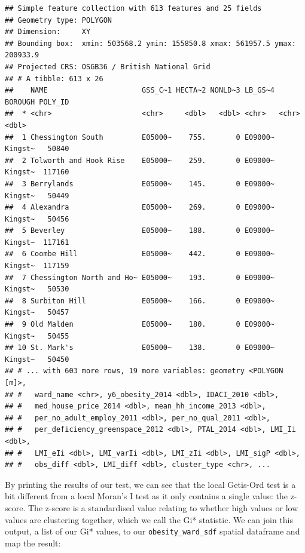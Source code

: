 \documentclass[
]{book}
\begin{document}
\begin{verbatim}
## Simple feature collection with 613 features and 25 fields
## Geometry type: POLYGON
## Dimension:     XY
## Bounding box:  xmin: 503568.2 ymin: 155850.8 xmax: 561957.5 ymax: 200933.9
## Projected CRS: OSGB36 / British National Grid
## # A tibble: 613 x 26
##    NAME                      GSS_C~1 HECTA~2 NONLD~3 LB_GS~4 BOROUGH POLY_ID
##  * <chr>                     <chr>     <dbl>   <dbl> <chr>   <chr>     <dbl>
##  1 Chessington South         E05000~    755.       0 E09000~ Kingst~   50840
##  2 Tolworth and Hook Rise    E05000~    259.       0 E09000~ Kingst~  117160
##  3 Berrylands                E05000~    145.       0 E09000~ Kingst~   50449
##  4 Alexandra                 E05000~    269.       0 E09000~ Kingst~   50456
##  5 Beverley                  E05000~    188.       0 E09000~ Kingst~  117161
##  6 Coombe Hill               E05000~    442.       0 E09000~ Kingst~  117159
##  7 Chessington North and Ho~ E05000~    193.       0 E09000~ Kingst~   50530
##  8 Surbiton Hill             E05000~    166.       0 E09000~ Kingst~   50457
##  9 Old Malden                E05000~    180.       0 E09000~ Kingst~   50455
## 10 St. Mark's                E05000~    138.       0 E09000~ Kingst~   50450
## # ... with 603 more rows, 19 more variables: geometry <POLYGON [m]>,
## #   ward_name <chr>, y6_obesity_2014 <dbl>, IDACI_2010 <dbl>,
## #   med_house_price_2014 <dbl>, mean_hh_income_2013 <dbl>,
## #   per_no_adult_employ_2011 <dbl>, per_no_qual_2011 <dbl>,
## #   per_deficiency_greenspace_2012 <dbl>, PTAL_2014 <dbl>, LMI_Ii <dbl>,
## #   LMI_eIi <dbl>, LMI_varIi <dbl>, LMI_zIi <dbl>, LMI_sigP <dbl>,
## #   obs_diff <dbl>, LMI_diff <dbl>, cluster_type <chr>, ...
\end{verbatim}

By printing the results of our test, we can see that the local Getis-Ord test is a bit different from a local Moran's I test as it only contains a single value: the z-score. The z-score is a standardised value relating to whether high values or low values are clustering together, which we call the Gi* statistic. We can join this output, a list of our Gi* values, to our \texttt{obesity\_ward\_sdf} spatial dataframe and map the result:
\end{document}
